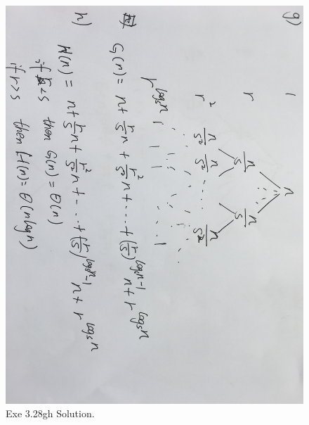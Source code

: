 \subsection{}
\begin{figure}[H]
  \includegraphics[width=\linewidth]{EX28gh.jpeg}
  \caption{Exe 3.28gh Solution.}
  \label{fig:solution 3.28gh}
\end{figure}

\subsection{}
